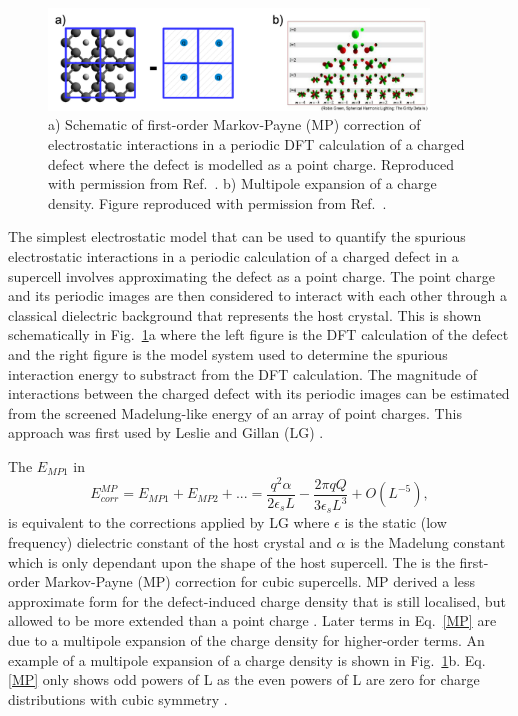 \documentclass[11pt, twoside]{report}
\begin{document}
\begin{figure}[h!]
  \centering
    \includegraphics[width=0.9\textwidth]{figures/new_IIC.png}
    \caption[a) Schematic of first-order Markov-Payne (MP) correction of electrostatic interactions in a periodic DFT calculation of a charged defect where the defect is modelled as a point charge.  b) Multipole expansion of a charge density.]{a) Schematic of first-order Markov-Payne (MP) correction of electrostatic interactions in a periodic DFT calculation of a charged defect where the defect is modelled as a point charge. Reproduced with permission from Ref.~. b) Multipole expansion of a charge density. Figure reproduced with permission from Ref.~.}
  \label{IIC}
\end{figure}

The simplest electrostatic model that can be used to quantify the spurious electrostatic interactions in a periodic calculation of a charged defect in a supercell involves approximating the defect as a point charge. The point charge and its periodic images are then considered to interact with each other through a classical dielectric background that represents the host crystal. This is shown schematically in Fig.~\ref{IIC}a where the left figure is the DFT calculation of the defect and the right figure is the model system used to determine the spurious interaction energy to substract from the DFT calculation. The magnitude of interactions between the charged defect with its periodic images can be estimated from the screened Madelung-like energy of an array of point charges. This approach was first used by Leslie and Gillan (LG) \cite{LeslieGillan}. 

The $E_{MP1}$ in
\begin{equation}\label{MP}
E^{MP}_{corr} = E_{MP1} + E_{MP2} + ... = \frac{q^2\alpha}{2 \epsilon_s L} - \frac{2 \pi q Q}{3 \epsilon_s L^3} + O(L^{-5}),
\end{equation}
is equivalent to the corrections applied by LG where $\epsilon$ is the static (low frequency) dielectric constant of the host crystal and $\alpha$ is the Madelung constant which is only dependant upon the shape of the host supercell. The is the first-order Markov-Payne (MP) correction for cubic supercells.
MP derived a less approximate form for the defect-induced charge density that is still localised, but allowed to be more extended than a point charge \cite{MP}. Later terms in Eq.~\ref{MP} are due to a multipole expansion of the charge density for higher-order terms. An example of a multipole expansion of a charge density is shown in Fig.~\ref{IIC}b. Eq. \ref{MP} only shows odd powers of L as the even powers of L are zero for charge distributions with cubic symmetry \cite{Durrant_defects}.
\end{document}
